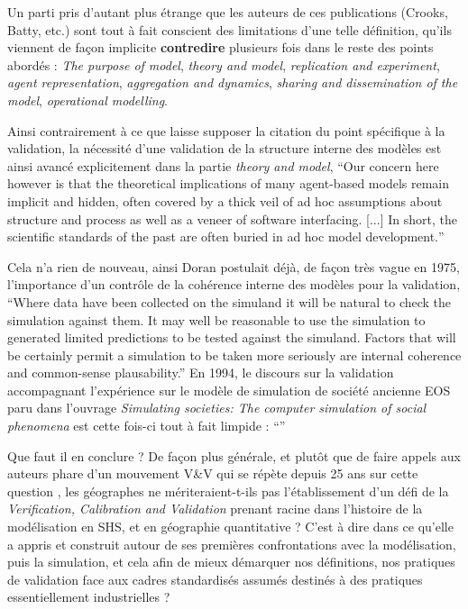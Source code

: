Un parti pris d'autant plus étrange que les auteurs de ces publications (Crooks, Batty, etc.) sont tout à fait conscient des limitations d'une telle définition, qu'ils viennent de façon implicite \textbf{contredire} plusieurs fois dans le reste des points abordés : \textit{The purpose of model}, \textit{theory and model}, \textit{replication and experiment}, \textit{agent representation}, \textit{aggregation and dynamics}, \textit{sharing and dissemination of the model}, \textit{operational modelling}.

Ainsi contrairement à ce que laisse supposer la citation du point spécifique à la validation, la nécessité d'une validation de la structure interne des modèles est ainsi avancé explicitement dans la partie \textit{theory and model}, \foreignquote{english}{Our concern here however is that the theoretical implications of many agent-based models remain implicit and hidden, often covered by a thick veil of ad hoc assumptions about structure and process as well as a veneer of software interfacing. [...] In short, the scientific standards of the past are often buried in ad hoc model development.}

Cela n'a rien de nouveau, ainsi Doran postulait déjà, de façon très vague en 1975,  l'importance d'un contrôle de la cohérence interne des modèles pour la validation, \enquote{Where data have been collected on the simuland it will be natural to check the simulation against them. It may well be reasonable to use the simulation to generated limited predictions to be tested against the simuland. Factors that will be certainly permit a simulation to be taken more seriously are internal coherence and common-sense plausability.} En 1994, le discours sur la validation accompagnant l'expérience sur le modèle de simulation de société ancienne EOS paru dans l'ouvrage \textit{Simulating societies: The computer simulation of social phenomena} est cette fois-ci tout à fait limpide : \foreignquote{english}{} \autocite[10-12]{Doran1994}

Que faut il en conclure ? De façon plus générale, et plutôt que de faire appels aux auteurs phare d'un mouvement V\&V qui se répète depuis 25 ans sur cette question \autocite{Sargent1983, Sargent2010}, les géographes ne mériteraient-t-ils pas l'établissement d'un défi de la \textit{Verification, Calibration and Validation} prenant racine dans l'histoire de la modélisation en SHS, et en géographie quantitative ? C'est à dire dans ce qu'elle a appris et construit autour de ses premières confrontations avec la modélisation, puis la simulation, et cela afin de mieux démarquer nos définitions, nos pratiques de validation face aux cadres standardisés assumés destinés à des pratiques essentiellement industrielles ? 

